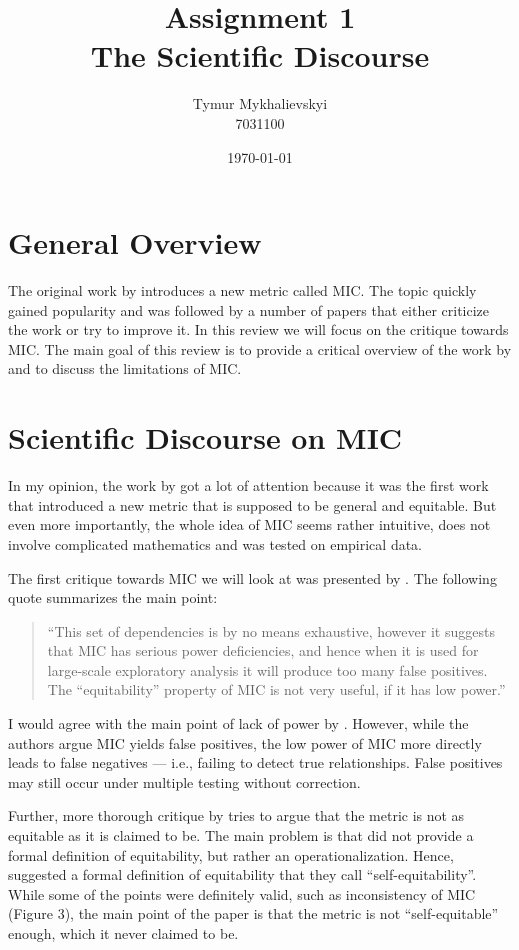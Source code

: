 \documentclass{article}
\title{\vspace{-2cm}Assignment 1\\
    The Scientific Discourse}
\author{Tymur Mykhalievskyi\\ 7031100}
\date{\today}
\begin{document}
\maketitle

\section{General Overview}
The original work by \cite{reshef2011} introduces a new metric called MIC. The topic quickly gained popularity and was followed by a number of papers that either criticize the work or try to improve it. In this review we will focus on the critique towards MIC. The main goal of this review is to provide a critical overview of the work by \cite{reshef2011} and to discuss the limitations of MIC. 

\section{Scientific Discourse on MIC}
\label{sec:discourse}
In my opinion, the work by \cite{reshef2011} got a lot of attention because it was the first work that introduced a new metric that is supposed to be general and equitable. But even more importantly, the whole idea of MIC seems rather intuitive, does not involve complicated mathematics and was tested on empirical data. 

The first critique towards MIC we will look at was presented by \cite{simon2014}. The following quote summarizes the main point: 
\begin{quote}
    ``This set of dependencies is by no means exhaustive, however it suggests that MIC has serious power deficiencies, and hence when it is used for large-scale exploratory analysis it will produce too many false positives. The ``equitability'' property of MIC is not very useful, if it has low power.''
\end{quote}

I would agree with the main point of lack of power by \cite{simon2014}. However, while the authors argue MIC yields false positives, the low power of MIC more directly leads to false negatives — i.e., failing to detect true relationships. False positives may still occur under multiple testing without correction.

Further, more thorough critique by \cite{kinney2014} tries to argue that the metric is not as equitable as it is claimed to be. The main problem is that \cite{reshef2011} did not provide a formal definition of equitability, but rather an operationalization. Hence, \cite{kinney2014} suggested a formal definition of equitability that they call ``self-equitability''. While some of the points were definitely valid, such as inconsistency of MIC \citep{kinney2014} (Figure 3), the main point of the paper is that the metric is not ``self-equitable'' enough, which it never claimed to be. 
\end{document}
